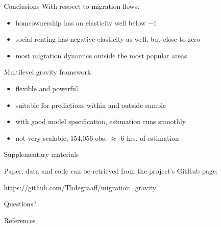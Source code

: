 \documentclass{beamer}
\begin{document}
\begin{frame}{Conclusions}
With respect to migration flows:
\begin{itemize}
	\item homeownership has an elasticity well below $-1$
	\item social renting has negative elasticity as well, but close to zero
	\item most migration dynamics outside the most popular areas 
\end{itemize}

Multilevel gravity framework
\begin{itemize}
	\item flexible and powerful
	\item suitable for predictions \alert{within} and \alert{outside} sample
	\item with good model specification, estimation runs smoothly
	\item not very scalable; 154,056 obs. $\approx$ 6 hrs. of estimation
\end{itemize}
\end{frame}

\begin{frame}{Supplementary materials}

Paper, data and code can be retrieved from the project's GitHub page: 

\begin{center}\url{https://github.com/Thdegraaff/migration\_gravity}\end{center}

\end{frame}

\begin{frame}[standout]
Questions?
\end{frame}

\appendix

\begin{frame}[allowframebreaks]{References}

		\printbibliography[heading=none]

\end{frame}
\end{document}

